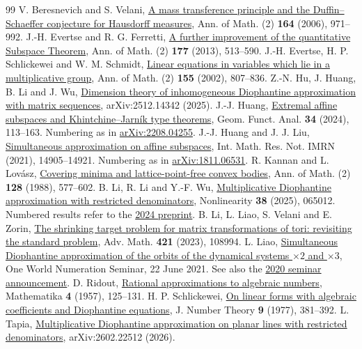 \documentclass[11pt,reqno,a4paper]{amsart}
\theoremstyle{remark}
\numberwithin{equation}{section}
\begin{document}
\begin{thebibliography}{99}
 V. Beresnevich and S. Velani, \href{https://doi.org/10.4007/annals.2006.164.971}{A mass transference principle and the Duffin--Schaeffer conjecture for Hausdorff measures}, Ann. of Math. (2) \textbf{164} (2006), 971--992.
 J.-H. Evertse and R. G. Ferretti, \href{https://annals.math.princeton.edu/2013/177-2/p04}{A further improvement of the quantitative Subspace Theorem}, Ann. of Math. (2) \textbf{177} (2013), 513--590.
 J.-H. Evertse, H. P. Schlickewei and W. M. Schmidt, \href{https://annals.math.princeton.edu/2002/155-3/p04}{Linear equations in variables which lie in a multiplicative group}, Ann. of Math. (2) \textbf{155} (2002), 807--836.
 Z.-N. Hu, J. Huang, B. Li and J. Wu, \href{https://arxiv.org/abs/2512.14342}{Dimension theory of inhomogeneous Diophantine approximation with matrix sequences}, arXiv:2512.14342 (2025).
 J.-J. Huang, \href{https://doi.org/10.1007/s00039-024-00665-y}{Extremal affine subspaces and Khintchine--Jarn\'ik type theorems}, Geom. Funct. Anal. \textbf{34} (2024), 113--163. Numbering as in \href{https://arxiv.org/abs/2208.04255}{arXiv:2208.04255}.
 J.-J. Huang and J. J. Liu, \href{https://doi.org/10.1093/imrn/rnz190}{Simultaneous approximation on affine subspaces}, Int. Math. Res. Not. IMRN (2021), 14905--14921. Numbering as in \href{https://arxiv.org/abs/1811.06531}{arXiv:1811.06531}.
 R. Kannan and L. Lov\'asz, \href{https://doi.org/10.2307/1971436}{Covering minima and lattice-point-free convex bodies}, Ann. of Math. (2) \textbf{128} (1988), 577--602.
 B. Li, R. Li and Y.-F. Wu, \href{https://doi.org/10.1088/1361-6544/add833}{Multiplicative Diophantine approximation with restricted denominators}, Nonlinearity \textbf{38} (2025), 065012. Numbered results refer to the \href{https://arxiv.org/abs/2409.18635v1}{2024 preprint}.
 B. Li, L. Liao, S. Velani and E. Zorin, \href{https://doi.org/10.1016/j.aim.2023.108994}{The shrinking target problem for matrix transformations of tori: revisiting the standard problem}, Adv. Math. \textbf{421} (2023), 108994.
 L. Liao, \href{https://www.irif.fr/~numeration/uploads/Main/liao_20210622.pdf}{Simultaneous Diophantine approximation of the orbits of the dynamical systems \(\times2\) and \(\times3\)}, One World Numeration Seminar, 22 June 2021. See also the \href{https://math.fudan.edu.cn/_upload/article/files/04/9a/c1bb972445f8bc251f2393851124/ca9abc61-6a2f-49f7-b4c9-68d95cb87966.pdf}{2020 seminar announcement}.
 D. Ridout, \href{https://doi.org/10.1112/S0025579300001182}{Rational approximations to algebraic numbers}, Mathematika \textbf{4} (1957), 125--131.
 H. P. Schlickewei, \href{https://doi.org/10.1016/0022-314X(77)90073-7}{On linear forms with algebraic coefficients and Diophantine equations}, J. Number Theory \textbf{9} (1977), 381--392.
 L. Tapia, \href{https://arxiv.org/abs/2602.22512}{Multiplicative Diophantine approximation on planar lines with restricted denominators}, arXiv:2602.22512 (2026).
\end{thebibliography}
\end{document}
